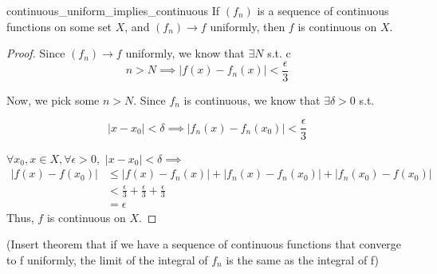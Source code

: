 \begin{thm}{}{continuous_uniform_implies_continuous}
If \((f_n)\) is a sequence of continuous functions on some set \(X\), and \((f_n) \to f\) uniformly, then \(f\) is continuous on \(X\).
\newline
\begin{proof}
Since \((f_n)\to f\) uniformly, we know that \(\exists N\) s.t. 
c\begin{equation*}
n > N \implies |f(x) - f_n(x)| < \frac{\epsilon}{3}
\end{equation*}

Now, we pick some \(n>N\). Since \(f_n\) is continuous, we know that \(\exists \delta > 0\) s.t. 

\begin{equation*}
|x - x_0| < \delta \implies |f_n(x) - f_n(x_0)| < \frac{\epsilon}{3}
\end{equation*}

\(\forall x_0,x \in X, \forall \epsilon > 0,\)
\newline
\(|x - x_0| < \delta \implies\) 
\begin{align*}
|f(x) - f(x_0)| &\leq |f(x) - f_n(x)| + |f_n(x) - f_n(x_0)| + |f_n(x_0) - f(x_0)| \\
		   &< \frac{\epsilon}{3} + \frac{\epsilon}{3} + \frac{\epsilon}{3} \\
		   &= \epsilon
\end{align*}
Thus, \(f\) is continuous on \(X\).




\end{proof}
\end{thm}
(Insert theorem that if we have a sequence of continuous functions that converge to f uniformly, the limit of the integral of \(f_n\) is the same as the integral of f)